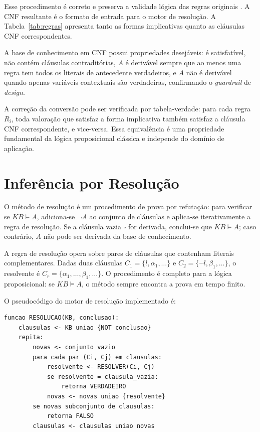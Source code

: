 \documentclass[
    12pt,
    openright,
    oneside,
    a4paper,
    english,
    brazil
]{abntex2}
\begin{document}
Esse procedimento é correto e preserva a validade lógica das regras originais \cite{russell_norvig_2022}. A CNF resultante é o formato de entrada para o motor de resolução. A Tabela~\ref{tab:regras} apresenta tanto as formas implicativas quanto as cláusulas CNF correspondentes.

A base de conhecimento em CNF possui propriedades desejáveis: é satisfatível, não contém cláusulas contraditórias, $A$ é derivável sempre que ao menos uma regra tem todos os literais de antecedente verdadeiros, e $A$ não é derivável quando apenas variáveis contextuais são verdadeiras, confirmando o \textit{guardrail} de \textit{design}.

A correção da conversão pode ser verificada por tabela-verdade: para cada regra $R_i$, toda valoração que satisfaz a forma implicativa também satisfaz a cláusula CNF correspondente, e vice-versa. Essa equivalência é uma propriedade fundamental da lógica proposicional clássica e independe do domínio de aplicação.

\chapter{Inferência por Resolução}

O método de resolução é um procedimento de prova por refutação: para verificar se $KB \models A$, adiciona-se $\neg A$ ao conjunto de cláusulas e aplica-se iterativamente a regra de resolução. Se a cláusula vazia $\square$ for derivada, conclui-se que $KB \models A$; caso contrário, $A$ não pode ser derivada da base de conhecimento.

A regra de resolução opera sobre pares de cláusulas que contenham literais complementares. Dadas duas cláusulas $C_1 = \{l, \alpha_1, \ldots\}$ e $C_2 = \{\neg l, \beta_1, \ldots\}$, o resolvente é $C_r = \{\alpha_1, \ldots, \beta_1, \ldots\}$. O procedimento é completo para a lógica proposicional: se $KB \models A$, o método sempre encontra a prova em tempo finito.

O pseudocódigo do motor de resolução implementado é:

\begin{lstlisting}[caption={Pseudocódigo do motor de resolução.},label={lst:pseudocodigo}]
funcao RESOLUCAO(KB, conclusao):
    clausulas <- KB uniao {NOT conclusao}
    repita:
        novas <- conjunto vazio
        para cada par (Ci, Cj) em clausulas:
            resolvente <- RESOLVER(Ci, Cj)
            se resolvente = clausula_vazia:
                retorna VERDADEIRO
            novas <- novas uniao {resolvente}
        se novas subconjunto de clausulas:
            retorna FALSO
        clausulas <- clausulas uniao novas
\end{lstlisting}
\end{document}
